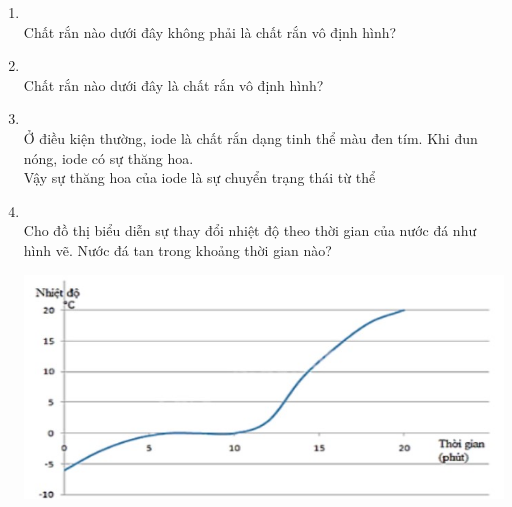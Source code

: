 \begin{enumerate}[label=\bfseries Câu \arabic*:,leftmargin=1.7cm]
\item {}\\
Chất rắn nào dưới đây không phải là chất rắn vô định hình?

\item {}\\
Chất rắn nào dưới đây là chất rắn vô định hình?

\item {}\\
Ở điều kiện thường, iode là chất rắn dạng tinh thể màu đen tím. Khi đun nóng, iode có sự thăng hoa.\\
Vậy sự thăng hoa của iode là sự chuyển trạng thái từ thể

\item {}\\
Cho đồ thị biểu diễn sự thay đổi nhiệt độ theo thời gian của nước đá như hình vẽ. Nước đá tan trong khoảng thời gian nào?
\begin{center}
	\includegraphics[width=0.6\linewidth]{../figs/VN12-Y24-PH-SYL-001P-1}
\end{center}


\end{enumerate}
